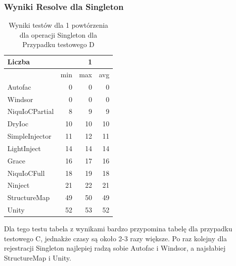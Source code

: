 \documentclass[12pt]{article}
\begin{document}
\subsubsection{Wyniki Resolve dla Singleton}
\begin{table}[H]
\captionsetup{belowskip=0pt,aboveskip=0pt}
\begin{center}
\begin{small}
	\begin{tabular}{ | l | r r r | }
    		\hline
Liczba & & 1 & \\ \hline
 & min & max & avg \\ \hline
Autofac & 0 & 0 & 0 \\ \hline
Windsor & 0 & 0 & 0 \\ \hline
NiquIoCPartial & 8 & 9 & 9 \\ \hline
DryIoc & 10 & 10 & 10 \\ \hline
SimpleInjector & 11 & 12 & 11 \\ \hline
LightInject & 14 & 14 & 14 \\ \hline
Grace & 16 & 17 & 16 \\ \hline
NiquIoCFull & 18 & 19 & 18 \\ \hline
Ninject & 21 & 22 & 21 \\ \hline
StructureMap & 49 & 50 & 49 \\ \hline
Unity & 52 & 53 & 52 \\ \hline
  	\end{tabular}
\end{small}
\end{center}
\caption{Wyniki testów dla 1 powtórzenia dla operacji Singleton dla Przypadku testowego D}
\label{TestCaseD_Singleton1}
\end{table}
Dla tego testu tabela z wynikami bardzo przypomina tabelę dla przypadku testowego C, jednakże czasy są około 2-3 razy większe. Po raz kolejny dla rejestracji Singleton najlepiej radzą sobie Autofac i Windsor, a najsłabiej StructureMap i Unity.
\\ \\
\end{document}
